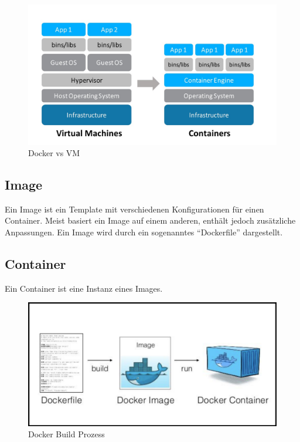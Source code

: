 \begin{figure}[H]
  \centering
  \includegraphics[scale=0.35]{images/containertech.jpg}
  \caption{Docker vs VM}
  \label{contTech}
\end{figure}
\subsection{Image}
Ein Image ist ein Template mit verschiedenen Konfigurationen für einen Container. Meist basiert
ein Image auf einem anderen, enthält jedoch zusätzliche Anpassungen.
Ein Image wird durch ein sogenanntes “Dockerfile” dargestellt.
\subsection{Container}
Ein Container ist eine Instanz eines Images.

\begin{figure}[H]
  \centering
  \includegraphics[scale=0.35]{images/docker.PNG}
  \caption{Docker Build Prozess}
  \label{performance}
\end{figure}


